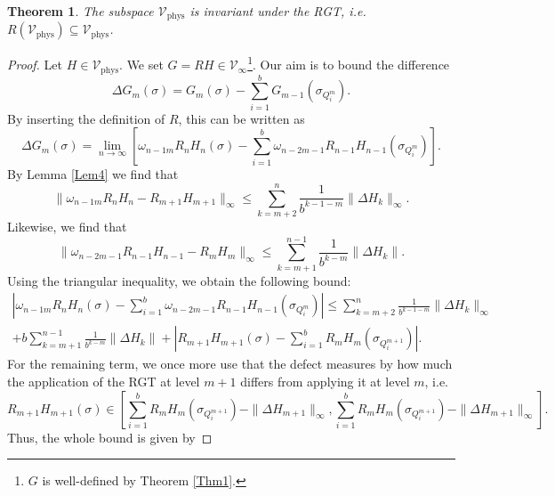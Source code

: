 \documentclass{article}
\newtheorem{theorem}{Theorem}[section]
\newcommand{\phys}{\mathrm{phys}}
\begin{document}
\begin{theorem}\label{Thm2}
    The subspace $\mathcal{V}_\mathrm{phys}$ is invariant under the RGT, i.e.\ $R(\mathcal{V}_\mathrm{phys})\subseteq \mathcal{V}_\mathrm{phys}$.
\end{theorem}

\begin{proof}
    Let $H\in \mathcal{V}_\phys$. We set $G=RH\in \mathcal{V}_\infty$\footnote{$G$ is well-defined by Theorem \ref{Thm1}.}. Our aim is to bound the difference
    \begin{equation}
        \Delta G_m(\sigma)=G_m(\sigma)-\sum_{i=1}^bG_{m-1}(\sigma_{Q_i^m}).
    \end{equation}
    By inserting the definition of $R$, this can be written as
    \begin{equation}
        \Delta G_m(\sigma)=\lim_{n\to\infty}\left[\omega_{n-1m}R_nH_n(\sigma)-\sum_{i=1}^b\omega_{n-2m-1}R_{n-1}H_{n-1}(\sigma_{Q_i^m})\right].
    \end{equation}
    By Lemma \ref{Lem4} we find that
    \begin{equation}
        \|\omega_{n-1m}R_nH_n-R_{m+1}H_{m+1}\|_\infty\leq\sum_{k=m+2}^n\frac{1}{b^{k-1-m}}\|\Delta H_k\|_\infty.
    \end{equation}
    Likewise, we find that
    \begin{equation}
        \|\omega_{n-2m-1}R_{n-1}H_{n-1}-R_mH_m\|_\infty\leq\sum_{k=m+1}^{n-1}\frac{1}{b^{k-m}}\|\Delta H_k\|.
    \end{equation}
    Using the triangular inequality, we obtain the following bound:
    \begin{align}
        \left|\omega_{n-1m}R_nH_n(\sigma)-\sum_{i=1}^b\omega_{n-2m-1}R_{n-1}H_{n-1}(\sigma_{Q_i^m})\right|\leq\sum_{k=m+2}^n\frac{1}{b^{k-1-m}}\|\Delta H_k\|_\infty\nonumber\\+b\sum_{k=m+1}^{n-1}\frac{1}{b^{k-m}}\|\Delta H_k\|
        +\left|R_{m+1}H_{m+1}(\sigma)-\sum_{i=1}^bR_mH_m(\sigma_{Q_i^{m+1}})\right|.
    \end{align}
    For the remaining term, we once more use that the defect measures by how much the application of the RGT at level $m+1$ differs from applying it at level $m$, i.e.
    \begin{equation}
        R_{m+1}H_{m+1}(\sigma)\in\left[\sum_{i=1}^bR_mH_m(\sigma_{Q_i^{m+1}})-\|\Delta H_{m+1}\|_\infty,\sum_{i=1}^bR_mH_m(\sigma_{Q_i^{m+1}})-\|\Delta H_{m+1}\|_\infty\right].
    \end{equation}
    Thus, the whole bound is given by

\end{proof}
\end{document}
